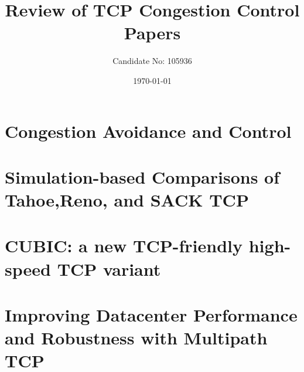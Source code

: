\documentclass[a4paper,12pt]{scrartcl}
\title{Review of TCP Congestion Control Papers}
\author{Candidate No: 105936}
\date{\today}
\begin{document}
	
	\begin{titlepage}
		\maketitle
	\end{titlepage}
	
	\tableofcontents
	\newpage
	
	\section{Congestion Avoidance and Control\cite{JacobsonCongestAvoidanceControlArticle}}{}
	\section{Simulation-based Comparisons of Tahoe,Reno, and SACK TCP\cite{FallFloydTahoeRenoSack}}{}
	\section{CUBIC: a new TCP-friendly high-speed TCP variant\cite{HaRheeXuCubic}}{}
	\section{Improving Datacenter Performance and Robustness with Multipath TCP\cite{RaiciuBarrePluntkeGreenhalghWischikHandleyMultipathTCPArticle}}{}
	\newpage
	
	\printbibliography[heading=bibintoc,title=References]
\end{document}
